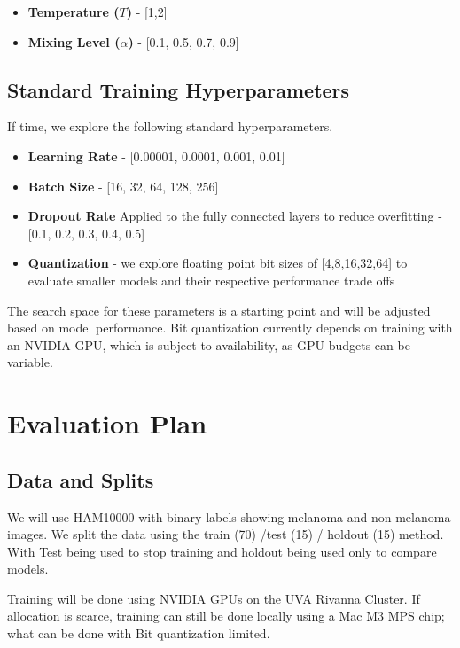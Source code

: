 \documentclass[conference]{IEEEtran}
\begin{document}
\begin{itemize}
    \item \textbf{Temperature ($T$)} - [1,2]
    \item \textbf{Mixing Level ($\alpha$)} - [0.1, 0.5, 0.7, 0.9]
\end{itemize}

\subsection*{Standard Training Hyperparameters}

If time, we explore the following standard hyperparameters.

\begin{itemize}
  \item \textbf{Learning Rate} - [0.00001, 0.0001, 0.001, 0.01]
  
  \item \textbf{Batch Size} - [16, 32, 64, 128, 256]
  
  \item \textbf{Dropout Rate} Applied to  the fully connected layers to reduce overfitting - [0.1, 0.2, 0.3, 0.4, 0.5]

  \item \textbf{Quantization} - we explore floating point bit sizes of [4,8,16,32,64] to evaluate smaller models and their respective performance trade offs
\end{itemize}

The search space for these parameters is a starting point and will be adjusted based on model performance. Bit quantization currently depends on training with an NVIDIA GPU, which is subject to availability, as GPU budgets can be variable.


\section*{Evaluation Plan}
\subsection*{Data and Splits}
We will use HAM10000 with binary labels showing melanoma and non-melanoma images. We split the data using the train (70) /test (15) / holdout (15) method. With Test being used to stop training and holdout being used only to compare models.


Training will be done using NVIDIA GPUs on the UVA Rivanna Cluster. If allocation is scarce, training can still be done locally using a Mac M3 MPS chip; what can be done with Bit quantization limited.
\end{document}
